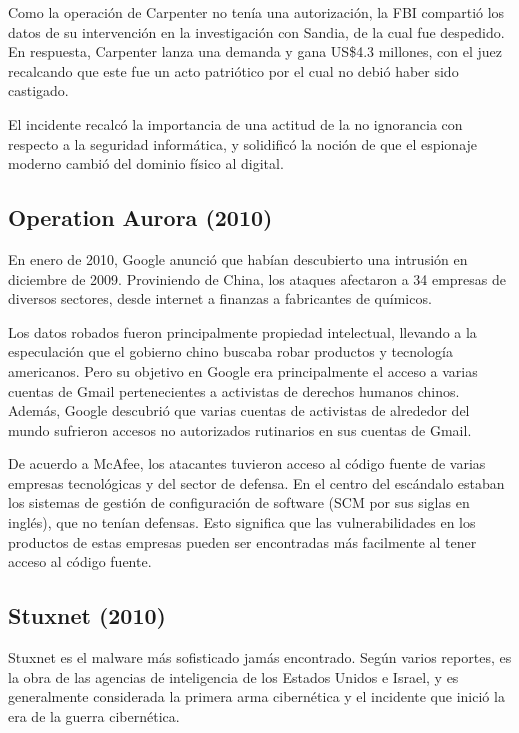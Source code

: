\documentclass{article}
\begin{document}
Como la operación de Carpenter no tenía una autorización, la FBI compartió los datos de su intervención en la investigación con Sandia, de la cual fue despedido. En respuesta, Carpenter lanza una demanda y gana US\$4.3 millones, con el juez recalcando que este fue un acto patriótico por el cual no debió haber sido castigado.

El incidente recalcó la importancia de una actitud de la no ignorancia con respecto a la seguridad informática, y solidificó la noción de que el espionaje moderno cambió del dominio físico al digital. \autocite{computerworld-titan-rain}

\subsection{Operation Aurora (2010)}
En enero de 2010, Google anunció que habían descubierto una intrusión en diciembre de 2009. Proviniendo de China, los ataques afectaron a 34 empresas de diversos sectores, desde internet a finanzas a fabricantes de químicos. 

Los datos robados fueron principalmente propiedad intelectual, llevando a la especulación que el gobierno chino buscaba robar productos y tecnología americanos. Pero su objetivo en Google era principalmente el acceso a varias cuentas de Gmail pertenecientes a activistas de derechos humanos chinos. Además, Google descubrió que varias cuentas de activistas de alrededor del mundo sufrieron accesos no autorizados rutinarios en sus cuentas de Gmail. \autocite{google-aurora}

De acuerdo a McAfee, los atacantes tuvieron acceso al código fuente de varias empresas tecnológicas y del sector de defensa. En el centro del escándalo estaban los sistemas de gestión de configuración de software (SCM por sus siglas en inglés), que no tenían defensas. Esto significa que las vulnerabilidades en los productos de estas empresas pueden ser encontradas más facilmente al tener acceso al código fuente. \autocite{wired-aurora}

\subsection{Stuxnet (2010)}
Stuxnet es el malware más sofisticado jamás encontrado. Según varios reportes, es la obra de las agencias de inteligencia de los Estados Unidos e Israel, y es generalmente considerada la primera arma cibernética y el incidente que inició la era de la guerra cibernética.
\end{document}
